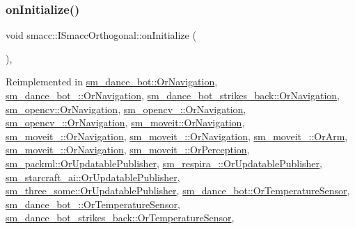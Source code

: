 \subsubsection{\texorpdfstring{on\+Initialize()}{onInitialize()}}
{\footnotesize\ttfamily void smacc\+::\+I\+Smacc\+Orthogonal\+::on\+Initialize (\begin{DoxyParamCaption}{ }\end{DoxyParamCaption})\hspace{0.3cm}{\ttfamily [protected]}, {\ttfamily [virtual]}}



Reimplemented in \hyperlink{classsm__dance__bot_1_1OrNavigation_a9f87c78f5af67024c9eda25097a135ac}{sm\+\_\+dance\+\_\+bot\+::\+Or\+Navigation}, \hyperlink{classsm__dance__bot__2_1_1OrNavigation_acc491d801e0abacd9d152e048e77fab6}{sm\+\_\+dance\+\_\+bot\+\_\+::\+Or\+Navigation}, \hyperlink{classsm__dance__bot__strikes__back_1_1OrNavigation_a458a0c5fed04b9906c6943f1e7ac5bf0}{sm\+\_\+dance\+\_\+bot\+\_\+strikes\+\_\+back\+::\+Or\+Navigation}, \hyperlink{classsm__opencv_1_1OrNavigation_a62f5ac68bfa502e92cf1fe1e3ca31781}{sm\+\_\+opencv\+::\+Or\+Navigation}, \hyperlink{classsm__opencv__2_1_1OrNavigation_a57483274c7e02b66cc528b910108efe5}{sm\+\_\+opencv\+\_\+::\+Or\+Navigation}, \hyperlink{classsm__opencv__3_1_1OrNavigation_ac79a0995fbb57ac65d1658e4a3b5e882}{sm\+\_\+opencv\+\_\+::\+Or\+Navigation}, \hyperlink{classsm__moveit_1_1OrNavigation_a242ad8c4d031d2fae3343e8a46bfec57}{sm\+\_\+moveit\+::\+Or\+Navigation}, \hyperlink{classsm__moveit__2_1_1OrNavigation_a3f9cd72a7a8310950a8742b6c7c103a4}{sm\+\_\+moveit\+\_\+::\+Or\+Navigation}, \hyperlink{classsm__moveit__3_1_1OrNavigation_a9bbd4ec3907c954b95522f7797212fcc}{sm\+\_\+moveit\+\_\+::\+Or\+Navigation}, \hyperlink{classsm__moveit__4_1_1OrArm_a9269c0a4712d81a1ee18640c66fef0ff}{sm\+\_\+moveit\+\_\+::\+Or\+Arm}, \hyperlink{classsm__moveit__4_1_1OrNavigation_ab1e41361c47cfb8dc721e4643f5a83e9}{sm\+\_\+moveit\+\_\+::\+Or\+Navigation}, \hyperlink{classsm__moveit__4_1_1OrPerception_a3dee7db3c38b7873653999b893d29bbf}{sm\+\_\+moveit\+\_\+::\+Or\+Perception}, \hyperlink{classsm__packml_1_1OrUpdatablePublisher_a1689f8aac565881e3f65246b6d6ce6a2}{sm\+\_\+packml\+::\+Or\+Updatable\+Publisher}, \hyperlink{classsm__respira__1_1_1OrUpdatablePublisher_a0ae110d830e583571fc79b4daa9d424d}{sm\+\_\+respira\+\_\+::\+Or\+Updatable\+Publisher}, \hyperlink{classsm__starcraft__ai_1_1OrUpdatablePublisher_a349747bdf330b39d76871cd49d36d0eb}{sm\+\_\+starcraft\+\_\+ai\+::\+Or\+Updatable\+Publisher}, \hyperlink{classsm__three__some_1_1OrUpdatablePublisher_aecda3521d565c139c75080f12e7045e0}{sm\+\_\+three\+\_\+some\+::\+Or\+Updatable\+Publisher}, \hyperlink{classsm__dance__bot_1_1OrTemperatureSensor_a2e944e459a695774dcf7fdbd5ac93b01}{sm\+\_\+dance\+\_\+bot\+::\+Or\+Temperature\+Sensor}, \hyperlink{classsm__dance__bot__2_1_1OrTemperatureSensor_a8ffbdea008961e707101f496c6b91f50}{sm\+\_\+dance\+\_\+bot\+\_\+::\+Or\+Temperature\+Sensor}, \hyperlink{classsm__dance__bot__strikes__back_1_1OrTemperatureSensor_a5ad96122dd84bf27e0a1f5c7c87be7e2}{sm\+\_\+dance\+\_\+bot\+\_\+strikes\+\_\+back\+::\+Or\+Temperature\+Sensor}, 